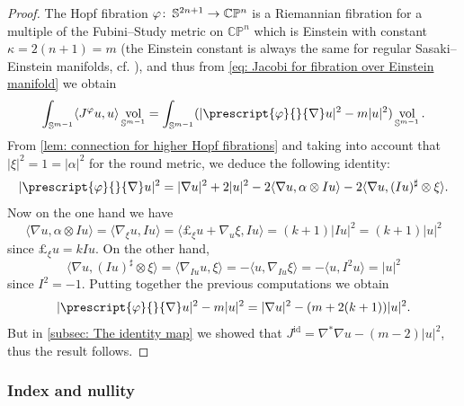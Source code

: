 \documentclass{article}
\numberwithin{equation}{section}        %
\theoremstyle{bfnote}
\theoremstyle{definition}
\theoremstyle{bfremark}
\newcommand{\col}{\colon \thinspace}        %
\newcommand{\C}{\mathbb{C}}                 %
\renewcommand{\P}{\mathbb{P}}               %
\newcommand{\Sp}{\mathbb{S}}                %
\DeclareMathOperator{\vol}{vol}                 %
\begin{document}
\begin{proof}
    The Hopf fibration $\varphi \col \Sp^{2n+1} \to \C\P^{n}$ is a Riemannian fibration for a multiple of the Fubini--Study metric on $\C\P^{n}$ which is Einstein with constant $\kappa = 2(n+1) = m$ (the Einstein constant is always the same for regular Sasaki--Einstein manifolds, cf. \cite{sparks2011sasaki}), and thus from \eqref{eq: Jacobi for fibration over Einstein manifold} we obtain
    \begin{equation*}
        \int_{\Sp^{m-1}} \langle J^\varphi u, u \rangle \vol_{\Sp^{m-1}} = \int_{\Sp^{m-1}} (|\prescript{\varphi}{}{\nabla} u|^2 - m|u|^2)\vol_{\Sp^{m-1}} .
    \end{equation*}
    From \cref{lem: connection for higher Hopf fibrations} and taking into account that $|\xi|^2 = 1 = |\alpha|^2$ for the round metric, we deduce the following identity:
    \begin{equation*}
        |\prescript{\varphi}{}{\nabla}u|^2 = |\nabla u|^2 + 2 |u|^2 - 2 \langle \nabla u, \alpha \otimes Iu \rangle - 2 \langle \nabla u, (Iu)^\sharp \otimes \xi \rangle .
    \end{equation*}
    Now on the one hand we have
    \begin{equation*}
        \langle \nabla u, \alpha \otimes Iu \rangle = \langle \nabla_\xi u, I u \rangle = \langle \pounds_\xi u + \nabla_u \xi, I u \rangle = (k+1) |Iu|^2 = (k+1) |u|^2
    \end{equation*}
    since $\pounds_\xi u = k Iu$. On the other hand,
    \begin{equation*}
        \langle \nabla u, (Iu)^\sharp \otimes \xi \rangle = \langle \nabla_{Iu} u, \xi \rangle = - \langle u, \nabla_{Iu} \xi \rangle = - \langle u, I^2 u \rangle = |u|^2 
    \end{equation*}
    since $I^2 = -1$. Putting together the previous computations we obtain
    \begin{equation*}
        |\prescript{\varphi}{}{\nabla} u|^2 - m|u|^2 = |\nabla u|^2 - (m + 2(k+1)) |u|^2 .
    \end{equation*}
    But in \cref{subsec: The identity map} we showed that $J^{\mathrm{id}} = \nabla^* \nabla u - (m-2)|u|^2$, thus the result follows.
\end{proof}


    \subsubsection{Index and nullity}       \label{subsubsec: index and nullity of hopf fibrations}
\end{document}

